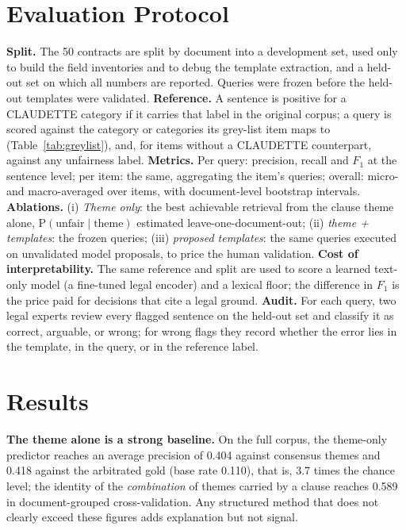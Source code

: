 \documentclass{IOS-Book-Article}
\newcommand{\corpus}{CLAUDETTE}
\begin{document}
\section{Evaluation Protocol}
\label{sec:protocol}
\textbf{Split.} The 50 contracts are split by document into a development set, used only to build the field inventories and to debug the template extraction, and a held-out set on which all numbers are reported. Queries were frozen before the held-out templates were validated. \textbf{Reference.} A sentence is positive for a \corpus{} category if it carries that label in the original corpus; a query is scored against the category or categories its grey-list item maps to (Table~\ref{tab:greylist}), and, for items without a \corpus{} counterpart, against any unfairness label. \textbf{Metrics.} Per query: precision, recall and $F_1$ at the sentence level; per item: the same, aggregating the item's queries; overall: micro- and macro-averaged over items, with document-level bootstrap intervals. \textbf{Ablations.} (i) \emph{Theme only}: the best achievable retrieval from the clause theme alone, $\mathrm{P}(\text{unfair} \mid \text{theme})$ estimated leave-one-document-out; (ii) \emph{theme + templates}: the frozen queries; (iii) \emph{proposed templates}: the same queries executed on unvalidated model proposals, to price the human validation. \textbf{Cost of interpretability.} The same reference and split are used to score a learned text-only model (a fine-tuned legal encoder) and a lexical floor; the difference in $F_1$ is the price paid for decisions that cite a legal ground. \textbf{Audit.} For each query, two legal experts review every flagged sentence on the held-out set and classify it as correct, arguable, or wrong; for wrong flags they record whether the error lies in the template, in the query, or in the reference label.

\section{Results}
\label{sec:results}
\textbf{The theme alone is a strong baseline.} On the full corpus, the theme-only predictor reaches an average precision of 0.404 against consensus themes and 0.418 against the arbitrated gold (base rate 0.110), that is, 3.7 times the chance level; the identity of the \emph{combination} of themes carried by a clause reaches 0.589 in document-grouped cross-validation. Any structured method that does not clearly exceed these figures adds explanation but not signal.
\end{document}
